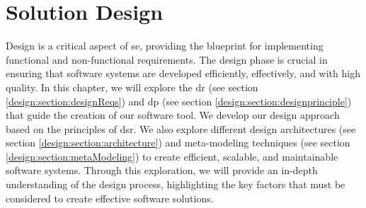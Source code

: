 
\chapter{Solution Design}

\ifpdf
    \graphicspath{{Chapters/Design/Figs/}{Chapters/Design/Figs/}{Chapters/Design/Figs/}}
\else
    \graphicspath{{Chapters/Design/Figs/}{Chapters/Design/Figs/}}
\fi
Design is a critical aspect of \ac{se}, providing the blueprint for implementing functional and non-functional requirements. 
The design phase is crucial in ensuring that software systems are developed efficiently, effectively, and with high quality. 
In this chapter, we will explore the \ac{dr} (see section \ref{design:section:designReqs}) and \ac{dp} (see section \ref{design:section:designprinciple}) that guide the creation of our software tool.
We develop our design approach based on the principles of \ac{dsr}.
We also explore different design architectures (see section \ref{design:section:architecture}) and meta-modeling techniques (see section \ref{design:section:metaModeling}) to create efficient, scalable, and maintainable software systems. 
Through this exploration, we will provide an in-depth understanding of the design process, highlighting the key factors that must be considered to create effective software solutions.

